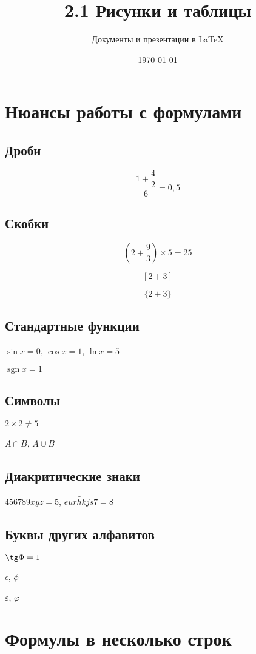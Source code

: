 \documentclass[a4paper,12pt]{article}
\author{Документы и презентации в \LaTeX}
\title{2.1 Рисунки и таблицы}
\date{\today}
\DeclareMathOperator{\sgn}{\mathop{sgn}}
\begin{document}



\section{Нюансы работы с формулами}

\subsection{Дроби}

\[\frac{1+\dfrac{4}{2}}{6} = 0,5\]

\subsection{Скобки}

\[ \left(2+\frac{9}{3}\right) \times 5 = 25 \]

\[  [2+3]  \]

\[ \{2+3\}  \]

\subsection{Стандартные функции}

$\sin x = 0$, $\cos x = 1$, $\ln x = 5$

$\sgn  x = 1$

\subsection{Символы}

$2\times 2 \ne 5$

$A \cap B$, $A \cup B$

\subsection{Диакритические знаки}

$\overline{456789xyz}=5$, $\widetilde{eurhkjs7} = 8$

\subsection{Буквы других алфавитов}

$\tg \Phi = 1$

$\epsilon$, $\phi$

$\varepsilon$, $\varphi$

\section{Формулы в несколько строк}
\end{document}
